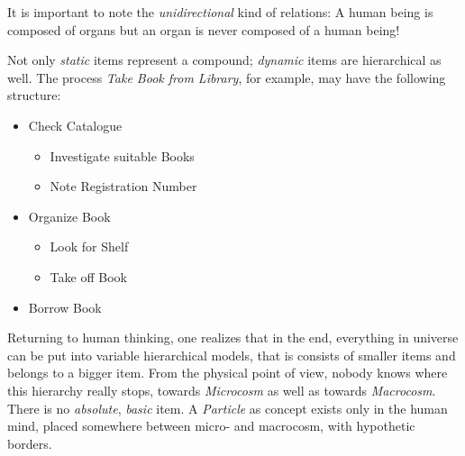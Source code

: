 It is important to note the \emph{unidirectional} kind of relations: A human
being is composed of organs but an organ is never composed of a human being!

Not only \emph{static} items represent a compound; \emph{dynamic} items are
hierarchical as well. The process \emph{Take Book from Library}, for example,
may have the following structure:

\begin{itemize}
    \item{Check Catalogue}
    \begin{itemize}
        \item{Investigate suitable Books}
        \item{Note Registration Number}
    \end{itemize}
    \item{Organize Book}
    \begin{itemize}
        \item{Look for Shelf}
        \item{Take off Book}
    \end{itemize}
    \item{Borrow Book}
\end{itemize}

Returning to human thinking, one realizes that in the end, everything in universe
can be put into variable hierarchical models, that is consists of smaller items
and belongs to a bigger item. From the physical point of view, nobody knows where
this hierarchy really stops, towards \emph{Microcosm} as well as towards
\emph{Macrocosm}. There is no \emph{absolute}, \emph{basic} item.
A \emph{Particle} as concept exists only in the human mind, placed somewhere
between micro- and macrocosm, with hypothetic borders.
